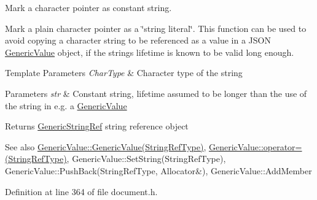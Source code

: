 Mark a character pointer as constant string. 

Mark a plain character pointer as a \char`\"{}string literal\char`\"{}. This function can be used to avoid copying a character string to be referenced as a value in a J\+S\+ON \mbox{\hyperlink{classrapidjson_1_1_generic_value}{Generic\+Value}} object, if the string\textquotesingle{}s lifetime is known to be valid long enough. 
\begin{DoxyTemplParams}{Template Parameters}
{\em Char\+Type} & Character type of the string \\
\hline
\end{DoxyTemplParams}

\begin{DoxyParams}{Parameters}
{\em str} & Constant string, lifetime assumed to be longer than the use of the string in e.\+g. a \mbox{\hyperlink{classrapidjson_1_1_generic_value}{Generic\+Value}} \\
\hline
\end{DoxyParams}
\begin{DoxyReturn}{Returns}
\mbox{\hyperlink{structrapidjson_1_1_generic_string_ref}{Generic\+String\+Ref}} string reference object
\end{DoxyReturn}
\begin{DoxySeeAlso}{See also}
\mbox{\hyperlink{classrapidjson_1_1_generic_value_a65bfc3073fa80ee5eba8e985abe2f941}{Generic\+Value\+::\+Generic\+Value(\+String\+Ref\+Type)}}, \mbox{\hyperlink{classrapidjson_1_1_generic_value_aecc9d0a6aafe31f4fdf9f6e75e5f089c}{Generic\+Value\+::operator=(\+String\+Ref\+Type)}}, Generic\+Value\+::\+Set\+String(\+String\+Ref\+Type), Generic\+Value\+::\+Push\+Back(\+String\+Ref\+Type, Allocator\&), Generic\+Value\+::\+Add\+Member 
\end{DoxySeeAlso}


Definition at line 364 of file document.\+h.


\begin{DoxyCode}{0}

\end{DoxyCode}
\mbox{\label{structrapidjson_1_1_generic_string_ref_a578c51ab574a50a9c760b9da7c7562f2}} 
